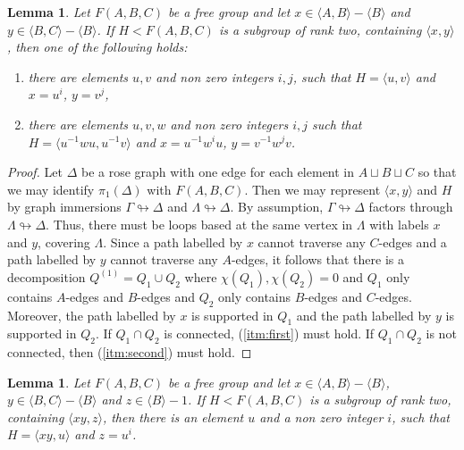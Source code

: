 \documentclass[11pt, a4paper]{amsart}
\newtheorem{lemma}[theorem]{Lemma}
\theoremstyle{definition}
\def\immerses{\looparrowright}
\begin{document}
\begin{lemma}
\label{malnormal_condition_1}
Let $F(A, B, C)$ be a free group and let $x\in\langle A, B\rangle - \langle B\rangle$ and $y\in \langle B, C\rangle - \langle B\rangle$. If $H<F(A, B, C)$ is a subgroup of rank two, containing $\langle x, y\rangle$, then one of the following holds:
\begin{enumerate}
\item\label{itm:first} there are elements $u, v$ and non zero integers $i, j$, such that $H = \langle u, v\rangle$ and $x = u^i$, $y = v^j$,
\item \label{itm:second} there are elements $u, v, w$ and non zero integers $i, j$ such that $H = \langle u^{-1}wu, u^{-1}v\rangle$ and $x = u^{-1}w^iu$, $y = v^{-1}w^jv$.
\end{enumerate}
\end{lemma}

\begin{proof}
Let $\Delta$ be a rose graph with one edge for each element in $A\sqcup B\sqcup C$ so that we may identify $\pi_1(\Delta)$ with $F(A, B, C)$. Then we may represent $\langle x, y\rangle$ and $H$ by graph immersions $\Gamma\immerses\Delta$ and $\Lambda\immerses\Delta$. By assumption, $\Gamma\immerses\Delta$ factors through $\Lambda\immerses\Delta$. Thus, there must be loops based at the same vertex in $\Lambda$ with labels $x$ and $y$, covering $\Lambda$. Since a path labelled by $x$ cannot traverse any $C$-edges and a path labelled by $y$ cannot traverse any $A$-edges, it follows that there is a decomposition $Q^{(1)} = Q_1\cup Q_2$ where $\chi(Q_1), \chi(Q_2) = 0$ and $Q_1$ only contains $A$-edges and $B$-edges and $Q_2$ only contains $B$-edges and $C$-edges. Moreover, the path labelled by $x$ is supported in $Q_1$ and the path labelled by $y$ is supported in $Q_2$. If $Q_1\cap Q_2$ is connected, (\ref{itm:first}) must hold. If $Q_1\cap Q_2$ is not connected, then (\ref{itm:second}) must hold.
\end{proof}


\begin{lemma}
\label{malnormal_condition_2}
Let $F(A, B, C)$ be a free group and let $x\in\langle A, B\rangle - \langle B\rangle$, $y\in \langle B, C\rangle - \langle B\rangle$ and $z\in \langle B\rangle - 1$. If $H<F(A, B, C)$ is a subgroup of rank two, containing $\langle xy, z\rangle$, then there is an element $u$ and a non zero integer $i$, such that $H = \langle xy, u\rangle$ and $z = u^i$.
\end{lemma}
\end{document}
